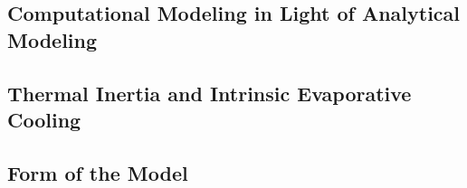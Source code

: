 %
%
%
%
%
%
%
%
%
%
%
%
%

\subsection{Computational Modeling in Light of Analytical Modeling}

\subsection{Thermal Inertia and Intrinsic Evaporative Cooling}

\subsection{Form of the Model}
